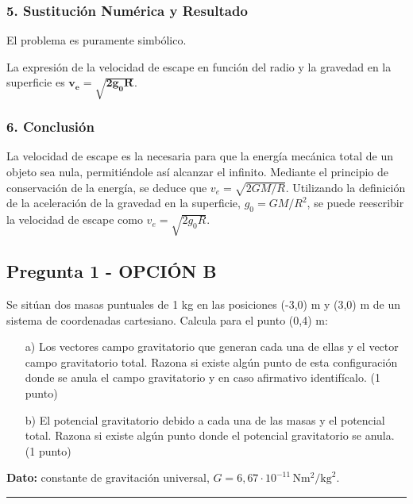 \subsubsection*{5. Sustitución Numérica y Resultado}
El problema es puramente simbólico.
\begin{cajaresultado}
    La expresión de la velocidad de escape en función del radio y la gravedad en la superficie es $\boldsymbol{v_e = \sqrt{2g_0 R}}$.
\end{cajaresultado}

\subsubsection*{6. Conclusión}
\begin{cajaconclusion}
La velocidad de escape es la necesaria para que la energía mecánica total de un objeto sea nula, permitiéndole así alcanzar el infinito. Mediante el principio de conservación de la energía, se deduce que $v_e = \sqrt{2GM/R}$. Utilizando la definición de la aceleración de la gravedad en la superficie, $g_0 = GM/R^2$, se puede reescribir la velocidad de escape como $v_e = \sqrt{2g_0 R}$.
\end{cajaconclusion}

\newpage

\subsection{Pregunta 1 - OPCIÓN B}
\label{subsec:1B_2019_jul_ext}

\begin{cajaenunciado}
Se sitúan dos masas puntuales de 1 kg en las posiciones (-3,0) m y (3,0) m de un sistema de coordenadas cartesiano. Calcula para el punto (0,4) m:
\begin{enumerate}
    \item[a)] Los vectores campo gravitatorio que generan cada una de ellas y el vector campo gravitatorio total. Razona si existe algún punto de esta configuración donde se anula el campo gravitatorio y en caso afirmativo identifícalo. (1 punto)
    \item[b)] El potencial gravitatorio debido a cada una de las masas y el potencial total. Razona si existe algún punto donde el potencial gravitatorio se anula. (1 punto)
\end{enumerate}
\textbf{Dato:} constante de gravitación universal, $G=6,67\cdot10^{-11}\,\text{N}\text{m}^2/\text{kg}^2$.
\end{cajaenunciado}
\hrule

